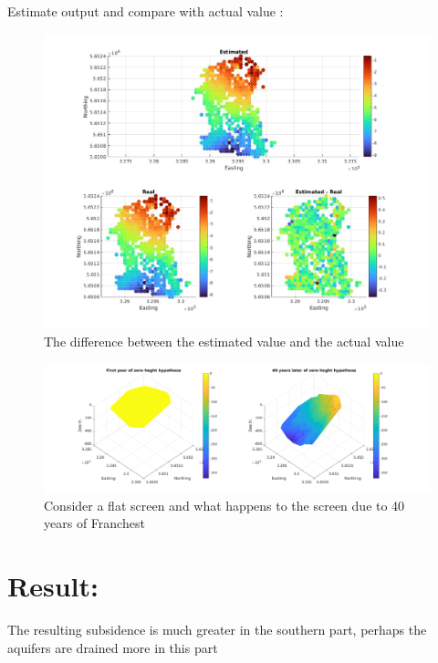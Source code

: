 \documentclass[12pt]{article}
\begin{document}
\newpage
Estimate output and compare with actual value :
\begin{figure}[h!]
    \centering
    \includegraphics[width=1\linewidth]{img/Result}
    \caption{
The difference between the estimated value and the actual value}
    \label{fig:dynamicprogramming}
\end{figure}


\begin{figure}[h!]
    \centering
    \includegraphics[width=1\linewidth]{img/40}
    \caption{Consider a flat screen and what happens to the screen due to 40 years of Franchest}
    \label{fig:dynamicprogramming}
\end{figure}
\section{Result:}
The resulting subsidence is much greater in the southern part, perhaps the aquifers are drained more in this part
\end{document}

